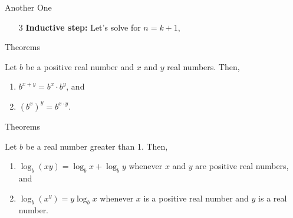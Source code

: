 \documentclass{beamer}
\renewcommand{\qed}{\\ \hfill $\blacksquare$}
\begin{document}
\begin{frame}{Another One}
    \begin{enumerate}
        \item[3] \textbf{Inductive step:} Let's solve for $n = k + 1$,
        { \scriptsize
            \uncover<+->{$$ (k + 1) \cdot (k + 2) \cdot (2k + 3) = (k + 1) \cdot (k + 2) \cdot (2k + 3) $$ \qed }
        }
    \end{enumerate}
\end{frame}

\begin{frame}{Theorems}
    \begin{theorem}\label{theo:one}
        Let $b$ be a positive real number and $x$ and $y$ real numbers. Then,
        \begin{enumerate}
         \item $b^{x+y} = b^x \cdot b^y$, and
         \item $(b^x)^y = b^{x \cdot y}$.
        \end{enumerate}
    \end{theorem}

\end{frame}

\begin{frame}{Theorems}
    \begin{theorem}\label{theo:two}
        Let $b$ be a real number greater than 1. Then,
        \begin{enumerate}
         \item $\log_b (xy) = \log_b x + \log_b y$ whenever $x$ and $y$ are positive real numbers, and
         \item $\log_b (x^y) = y \log_b x$ whenever $x$ is a positive real number and $y$ is a real number.
        \end{enumerate}
    \end{theorem}
\end{frame}
\end{document}
